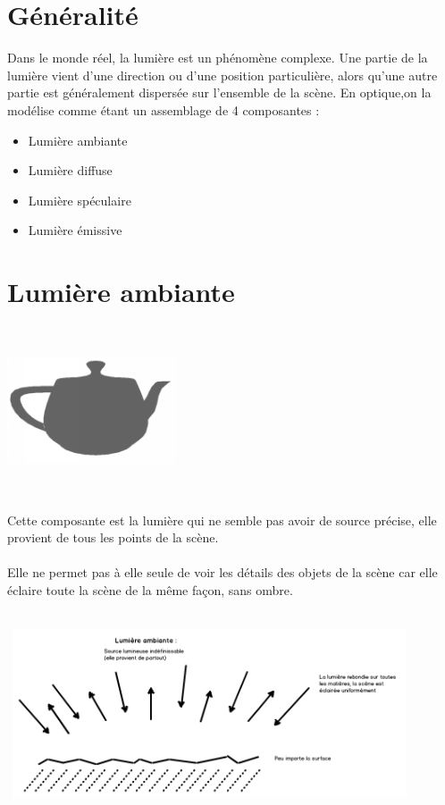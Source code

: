 \section{Généralité}
Dans le monde réel, la lumière est un phénomène complexe.
Une partie de la lumière vient d’une direction ou d’une position particulière, alors
qu’une autre partie est généralement dispersée sur l’ensemble de la scène. En optique,on la modélise comme étant un assemblage de 4 composantes :
\begin{itemize}
\item Lumière ambiante
\item Lumière diffuse
\item Lumière spéculaire
\item Lumière émissive
\end{itemize}

\section{Lumière ambiante}
\begin{center}
\includegraphics[width=5cm,height=5cm]{pipeline/images/objet_ambiante.png}
\end{center}
Cette composante est la lumière qui ne semble pas avoir de source précise, elle provient de tous les points de la scène.
\\\\
Elle ne permet pas à elle seule de voir les détails des objets de la scène car elle éclaire toute la scène de la même façon, sans ombre.
\\\\
\begin{center}
\includegraphics[width=12cm,height=5cm]{pipeline/images/lumiere_ambiante.png}
\end{center}

